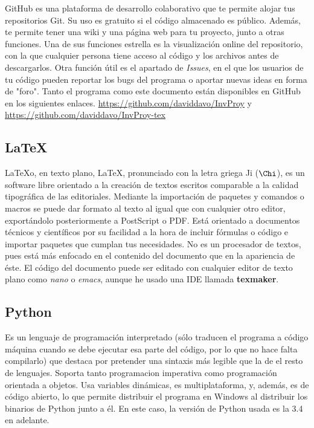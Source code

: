 \documentclass[a4paper, 11pt]{report} %
\begin{document}
GitHub es una plataforma de desarrollo colaborativo que te permite alojar tus repositorios Git. Su uso es gratuito si el código almacenado es público. Además, te permite tener una wiki y una página web para tu proyecto, junto a otras funciones.
Una de sus funciones estrella es la visualización online del repositorio, con la que cualquier persona tiene acceso al código y los archivos antes de descargarlos. Otra función útil es el apartado de \textit{Issues}, en el que los usuarios de tu código pueden reportar los bugs del programa o aportar nuevas ideas en forma de "foro".
Tanto el programa como este documento están disponibles en GitHub en los siguientes enlaces. \url{https://github.com/daviddavo/InvProy} y \url{https://github.com/daviddavo/InvProy-tex}

\subsection{LaTeX}
\LaTeX\space o, en texto plano, LaTeX, pronunciado con la letra griega 
Ji ($\Chi$), es un software libre orientado a la creación de textos escritos comparable a la calidad tipográfica de las editoriales. Mediante la importación de paquetes y comandos o macros se puede dar formato al texto al igual que con cualquier otro editor, exportándolo posteriormente a PostScript o PDF. Está orientado a documentos técnicos y científicos por su facilidad a la hora de incluir fórmulas o código e importar paquetes que cumplan tus necesidades. No es un procesador de textos, pues está más enfocado en el contenido del documento que en la apariencia de éste.
El código del documento puede ser editado con cualquier editor de texto plano como \textit{nano} o \textit{emacs}, aunque he usado una IDE llamada \textbf{texmaker}.

\subsection{Python}
Es un lenguaje de programación interpretado (sólo traducen el programa a código máquina cuando se debe ejecutar esa parte del código, por lo que no hace falta compilarlo) que destaca por pretender una sintaxis más legible que la de el resto de lenguajes. Soporta tanto \gls{programacion imperativa} como programación orientada a objetos. Usa variables dinámicas, es multiplataforma, y, además, es de código abierto, lo que permite distribuir el programa en Windows al distribuir los binarios de Python junto a él. En este caso, la versión de Python usada es la 3.4 en adelante.
\end{document}
